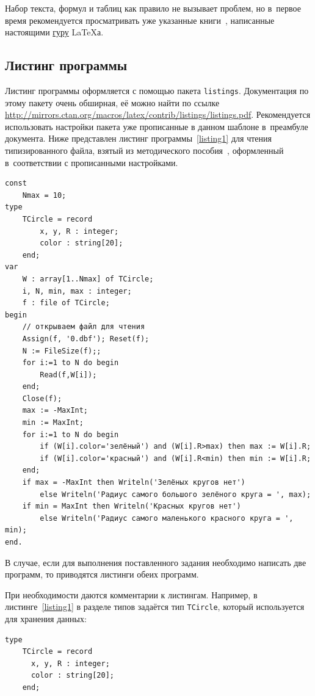 Набор текста, формул и таблиц как правило не вызывает проблем, но в~первое время рекомендуется просматривать уже указанные книги~\cite{latex:b1,latex:b2,latex:b3}, написанные настоящими \href{https://ru.wikipedia.org/wiki/%D0%93%D1%83%D1%80%D1%83_(%D0%B7%D0%BD%D0%B0%D1%87%D0%B5%D0%BD%D0%B8%D1%8F)}{гуру} \LaTeX{а}.

\subsection{Листинг программы}

Листинг программы оформляется с помощью пакета \verb"listings". 
Документация по этому пакету очень обширная, её можно найти по ссылке \url{http://mirrors.ctan.org/macros/latex/contrib/listings/listings.pdf}.
Рекомендуется использовать настройки пакета уже прописанные в данном шаблоне в~преамбуле документа. 
Ниже представлен листинг программы~\ref{listing1} для чтения типизированного файла, взятый из методического пособия~\cite{gutgut:1}, оформленный в~соответствии с прописанными настройками.

\begin{lstlisting}[label=listing1, caption=Программа чтения типизированного файла]
const
	Nmax = 10;
type
	TCircle = record
		x, y, R : integer;
		color : string[20];
	end;
var
	W : array[1..Nmax] of TCircle;
	i, N, min, max : integer;
	f : file of TCircle;
begin
	// открываем файл для чтения
	Assign(f, '0.dbf'); Reset(f);
	N := FileSize(f);;
	for i:=1 to N do begin
		Read(f,W[i]);
	end;
	Close(f);
	max := -MaxInt;
	min := MaxInt;
	for i:=1 to N do begin
		if (W[i].color='зелёный') and (W[i].R>max) then max := W[i].R;
		if (W[i].color='красный') and (W[i].R<min) then min := W[i].R;
  	end;
  	if max = -MaxInt then Writeln('Зелёных кругов нет')
  		else Writeln('Радиус самого большого зелёного круга = ', max);
	if min = MaxInt then Writeln('Красных кругов нет')
		else Writeln('Радиус самого маленького красного круга = ', min);
end.
\end{lstlisting}

В случае, если для выполнения поставленного задания необходимо написать две программ, то приводятся листинги обеих программ.

При необходимости даются комментарии к листингам. Например, в листинге~\ref{listing1} в разделе типов задаётся тип \verb"TCircle", который используется для хранения данных:
\begin{verbatim}
type
	TCircle = record
      x, y, R : integer;
      color : string[20];
    end;
\end{verbatim}

